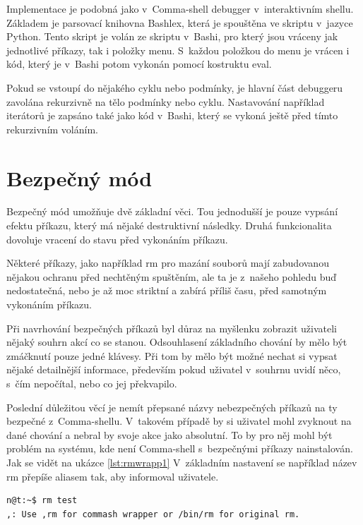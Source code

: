 \documentclass[thesis=M,czech]{FITthesis}[2012/06/26]
\begin{document}
Implementace je podobná jako v~Comma-shell debugger v~interaktivním shellu. Základem je parsovací knihovna Bashlex, která je spouštěna ve skriptu v~jazyce Python. Tento skript je volán ze skriptu v~Bashi, pro který jsou vráceny jak jednotlivé příkazy, tak i položky menu. S~každou položkou do menu je vrácen i kód, který je v~Bashi potom vykonán pomocí kostruktu eval.

Pokud se vstoupí do nějakého cyklu nebo podmínky, je hlavní část debuggeru zavolána rekurzivně na tělo podmínky nebo cyklu. Nastavování například iterátorů je zapsáno také jako kód v~Bashi, který se vykoná ještě před tímto rekurzivním voláním.


%
%
%
%
%
\section{Bezpečný mód}

Bezpečný mód umožňuje dvě základní věci. Tou jednodušší je pouze vypsání efektu příkazu, který má nějaké destruktivní následky. Druhá funkcionalita dovoluje vracení do stavu před vykonáním příkazu.

Některé příkazy, jako například rm pro mazání souborů mají zabudovanou nějakou ochranu před nechtěným spuštěním, ale ta je z~našeho pohledu buď nedostatečná, nebo je až moc striktní a zabírá příliš času, před samotným vykonáním příkazu.

Při navrhování bezpečných příkazů byl důraz na myšlenku zobrazit uživateli nějaký souhrn akcí co se stanou. Odsouhlasení základního chování by mělo být zmáčknutí pouze jedné klávesy. Při tom by mělo být možné nechat si vypsat nějaké detailnější informace, především pokud uživatel v~souhrnu uvidí něco, s~čím nepočítal, nebo co jej překvapilo.

Poslední důležitou věcí je nemít přepsané názvy nebezpečných příkazů na ty bezpečné z~Comma-shellu. V~takovém případě by si uživatel mohl zvyknout na dané chování a nebral by svoje akce jako absolutní. To by pro něj mohl být problém na systému, kde není Comma-shell s~bezpečnými příkazy nainstalován. Jak se vidět na ukázce \ref{lst:rmwrapp1} V~základním nastavení se například název rm přepíše aliasem tak, aby informoval uživatele.

\begin{minipage}{\linewidth}
\begin{lstlisting}[language=bash, caption={Přepsání nebezpečných příkazů}, label={lst:rmwrapp1}]
n@t:~$ rm test
,: Use ,rm for commash wrapper or /bin/rm for original rm.
\end{lstlisting}
\end{minipage}
\end{document}

